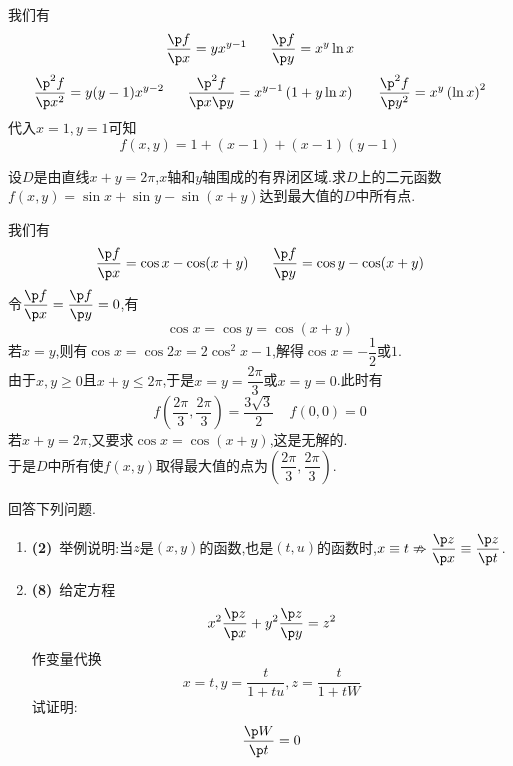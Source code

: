 \documentclass{ctexart}
\begin{document}
\begin{solution}
    我们有
    \[\dfrac{\p f}{\p x}=yx^{y-1}\ \ \ \ \ \dfrac{\p f}{\p y}=x^y\ln x\]
    \[\dfrac{\p^2 f}{\p x^2}=y(y-1)x^{y-2}\ \ \ \ \ \dfrac{\p^2 f}{\p x\p y}=x^{y-1}\left(1+y\ln x\right)\ \ \ \ \ \dfrac{\p^2 f}{\p y^2}=x^y\left(\ln x\right)^2\]
    代入$x=1,y=1$可知
    \[f(x,y)=1+(x-1)+(x-1)(y-1)\]
\end{solution}
\begin{problem}[6.(10\songti{分})]
    设$D$是由直线$x+y=2\pi$,$x$轴和$y$轴围成的有界闭区域.求$D$上的二元函数$f(x,y)=\sin x+\sin y-\sin(x+y)$达到最大值的$D$中所有点.
\end{problem}
\begin{solution}
    我们有\[\dfrac{\p f}{\p x}=\cos x-\cos(x+y)\ \ \ \ \ \dfrac{\p f}{\p y}=\cos y-\cos(x+y)\]
    令$\dfrac{\p f}{\p x}=\dfrac{\p f}{\p y}=0$,有\[\cos x=\cos y=\cos(x+y)\]
    若$x=y$,则有$\cos x=\cos 2x=2\cos^2x-1$,解得$\cos x=-\dfrac12$或$1$.\\
    由于$x,y\geqslant0$且$x+y\leqslant2\pi$,于是$x=y=\dfrac{2\pi}{3}$或$x=y=0$.此时有
    \[f\left(\dfrac{2\pi}{3},\dfrac{2\pi}{3}\right)=\dfrac{3\sqrt3}{2}\ \ \ \ \ f(0,0)=0\]
    若$x+y=2\pi$,又要求$\cos x=\cos(x+y)$,这是无解的.\\
    于是$D$中所有使$f(x,y)$取得最大值的点为$\left(\dfrac{2\pi}{3},\dfrac{2\pi}{3}\right)$.
\end{solution}
\begin{problem}[7.(10\songti{分})]
    回答下列问题.
    \begin{enumerate}[label=\tbf{(\arabic*)}]
        \item \textbf{(2)}\ 举例说明:当$z$是$(x,y)$的函数,也是$(t,u)$的函数时,$x\equiv t\nRightarrow \dfrac{\p z}{\p x}\equiv\dfrac{\p z}{\p t}$.
        \item \textbf{(8)}\ 给定方程\[x^2\dfrac{\p z}{\p x}+y^2\dfrac{\p z}{\p y}=z^2\]作变量代换\[x=t,y=\dfrac{t}{1+tu},z=\dfrac{t}{1+tW}\]试证明:\[\dfrac{\p W}{\p t}=0\]
    \end{enumerate}
\end{problem}
\end{document}
